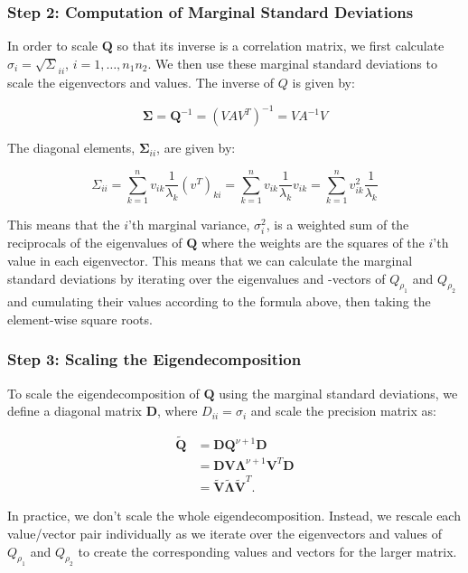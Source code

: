 \documentclass[
  letterpaper,
  DIV=11,
  numbers=noendperiod]{scrartcl}
\begin{document}
\subsubsection{Step 2: Computation of Marginal Standard
Deviations}\label{step-2-computation-of-marginal-standard-deviations}

In order to scale \(\mathbf Q\) so that its inverse is a correlation
matrix, we first calculate \(\sigma_i = \sqrt\Sigma_{ii}\),
\(i = 1, \dots, n_1n_2\). We then use these marginal standard deviations
to scale the eigenvectors and values. The inverse of \(Q\) is given by:

\[
\boldsymbol \Sigma = \mathbf Q^{-1} = (VAV^T)^{-1} = VA^{-1}V
\]

The diagonal elements, \(\boldsymbol \Sigma_{ii}\), are given by:

\[
\Sigma_{ii} = \sum_{k=1}^{n} v_{ik} \frac{1}{\lambda_k} (v^T)_{ki} = \sum_{k=1}^{n} v_{ik} \frac{1}{\lambda_k} v_{ik} = \sum_{k=1}^{n} v_{ik}^2 \frac{1}{\lambda_k}
\]

This means that the \(i\)'th marginal variance, \(\sigma_i^2\), is a
weighted sum of the reciprocals of the eigenvalues of \(\mathbf Q\)
where the weights are the squares of the \(i\)'th value in each
eigenvector. This means that we can calculate the marginal standard
deviations by iterating over the eigenvalues and -vectors of
\(Q_{\rho_1}\) and \(Q_{\rho_2}\) and cumulating their values according
to the formula above, then taking the element-wise square roots.

\subsubsection{Step 3: Scaling the
Eigendecomposition}\label{step-3-scaling-the-eigendecomposition}

To scale the eigendecomposition of \(\mathbf{Q}\) using the marginal
standard deviations, we define a diagonal matrix \(\mathbf{D}\), where
\(D_{ii} = \sigma_i\) and scale the precision matrix as:

\[
\begin{aligned}
\mathbf{\widetilde  Q} &= \mathbf{D}\mathbf{Q}^{\nu+1}\mathbf{D} \\
&= \mathbf{D}\mathbf{V}\mathbf{\Lambda}^{\nu+1}\mathbf{V}^T\mathbf{D} \\
&= \mathbf{\widetilde V}\mathbf{\widetilde\Lambda}\mathbf{\widetilde V}^T.
\end{aligned}
\]

In practice, we don't scale the whole eigendecomposition. Instead, we
rescale each value/vector pair individually as we iterate over the
eigenvectors and values of \(Q_{\rho_1}\) and \(Q_{\rho_2}\) to create
the corresponding values and vectors for the larger matrix.
\end{document}

